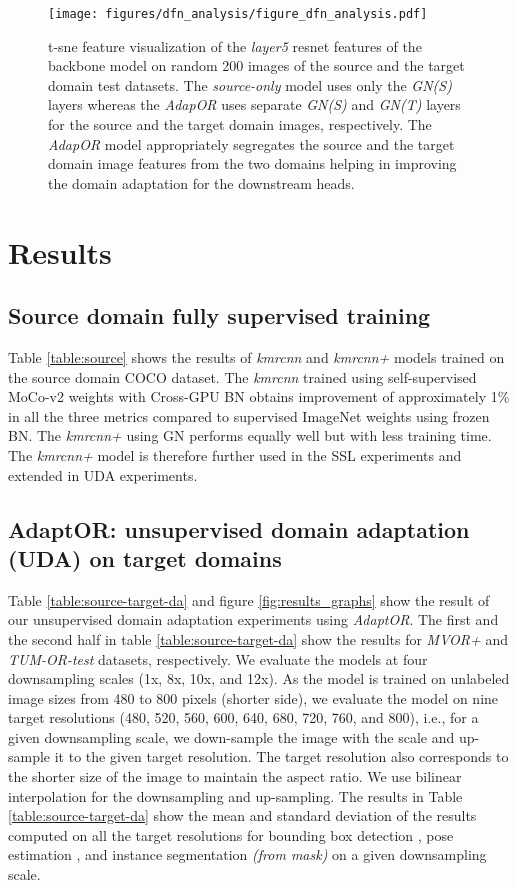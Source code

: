 \begin{figure*}[t!]
\centering
	\texttt{[image: figures/dfn\_analysis/figure\_dfn\_analysis.pdf]}
	\caption{\small{{\blue t-sne feature visualization \citep{van2008visualizing} of the \emph{layer5} resnet features of the backbone model on random 200 images of the source and the target domain test datasets. The \emph{source-only} model uses only the \emph{GN(S)} layers whereas the \emph{AdapOR} uses separate \emph{GN(S)} and \emph{GN(T)} layers for the source and the target domain images, respectively. The \emph{AdapOR} model appropriately segregates the source and the target domain image features from the two domains helping in improving the domain adaptation for the downstream heads.}}}
	\label{figure:dfn-comp}
\end{figure*}

\section{Results}
\subsection{Source domain fully supervised training}
Table \ref{table:source} shows the results of \emph{kmrcnn} and \emph{kmrcnn+} models trained on the source domain COCO dataset. The \emph{kmrcnn} trained using self-supervised MoCo-v2 weights with Cross-GPU BN \citep{peng2018megdet} obtains improvement of approximately 1\% in all the three metrics compared to supervised ImageNet weights using frozen BN. The \emph{kmrcnn+} using GN performs equally well but with less training time. The \emph{kmrcnn+} model is therefore further used in the SSL experiments and extended in UDA experiments.

\subsection{AdaptOR: unsupervised domain adaptation (UDA) on target domains}
Table \ref{table:source-target-da} and figure \ref{fig:results_graphs} show the result of our unsupervised domain adaptation experiments using \emph{AdaptOR}. The first and the second half in table \ref{table:source-target-da} show the results for \emph{MVOR+} and \emph{TUM-OR-test} datasets, respectively. We evaluate the models at four downsampling scales (1x, 8x, 10x, and 12x). As the model is trained on unlabeled image sizes from 480 to 800 pixels (shorter side), we evaluate the model on nine target resolutions (480, 520, 560, 600, 640, 680, 720, 760, and 800), i.e., for a given downsampling scale, we down-sample the image with the scale and up-sample it to the given target resolution. The target resolution also corresponds to the shorter size of the image to maintain the aspect ratio. We use bilinear interpolation for the downsampling and up-sampling. The results in Table \ref{table:source-target-da} show the mean and standard deviation of the results computed on all the target resolutions for bounding box detection \emph{}, pose estimation \emph{}, and instance segmentation \emph{ (from mask)} on a given downsampling scale.

